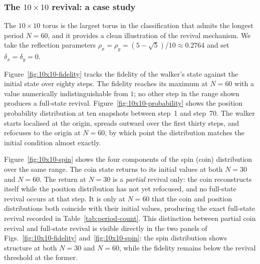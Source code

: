 \subsubsection{The $10 \times 10$ revival: a case study}

The $10 \times 10$ torus is the largest torus in the classification that
admits the longest period $N = 60$, and it provides a clean illustration
of the revival mechanism. We take the reflection parameters
$\rho_x = \rho_y = (5-\sqrt{5})/10 \approx 0.2764$ and set
$\delta_x = \delta_y = 0$.

Figure~\ref{fig:10x10-fidelity} tracks the fidelity of the walker's
state against the initial state over eighty steps. The fidelity reaches
its maximum at $N = 60$ with a value numerically indistinguishable from
$1$; no other step in the range shown produces a full-state revival.
Figure~\ref{fig:10x10-probability} shows the position probability
distribution at ten snapshots between step~1 and step~70. The walker
starts localised at the origin, spreads outward over the first thirty
steps, and refocuses to the origin at $N = 60$, by which point the
distribution matches the initial condition almost exactly.

Figure~\ref{fig:10x10-spin} shows the four components of the spin (coin)
distribution over the same range. The coin state returns to its initial
values at both $N = 30$ and $N = 60$. The return at $N = 30$ is a
\emph{partial} revival only: the coin reconstructs itself while the
position distribution has not yet refocused, and no full-state revival
occurs at that step. It is only at $N = 60$ that the coin and position
distributions both coincide with their initial values, producing the
exact full-state revival recorded in Table~\ref{tab:period-count}. This
distinction between partial coin revival and full-state revival is
visible directly in the two panels of Figs.~\ref{fig:10x10-fidelity}
and~\ref{fig:10x10-spin}: the spin distribution shows structure at both
$N = 30$ and $N = 60$, while the fidelity remains below the revival
threshold at the former.
